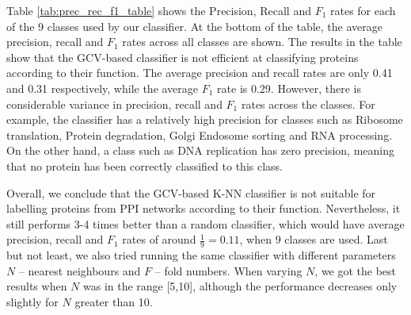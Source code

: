 Table \ref{tab:prec_rec_f1_table} shows the Precision, Recall and $F_1$ rates for each of the 9 classes used by our classifier. At the bottom of the table, the average precision, recall and $F_1$ rates across all classes are shown. The results in the table show that the GCV-based classifier is not efficient at classifying proteins according to their function. The average precision and recall rates are only 0.41 and 0.31 respectively, while the average $F_1$ rate is 0.29. However, there is considerable variance in precision, recall and $F_1$ rates across the classes. For example, the classifier has a relatively high precision for classes such as Ribosome translation, Protein degradation, Golgi Endosome sorting and RNA processing. On the other hand, a class such as DNA replication has zero precision, meaning that no protein has been correctly classified to this class.

Overall, we conclude that the GCV-based K-NN classifier is not suitable for labelling proteins from PPI networks according to their function. Nevertheless, it still performs 3-4 times better than a random classifier, which would have average precision, recall and $F_1$ rates of around $\frac{1}{9} = 0.11$, when 9 classes are used. Last but not least, we also tried running the same classifier with different parameters $N$ -- nearest neighbours and $F$ -- fold numbers. When varying $N$, we got the best results when $N$ was in the range [5,10], although the performance decreases only slightly for $N$ greater than 10.

